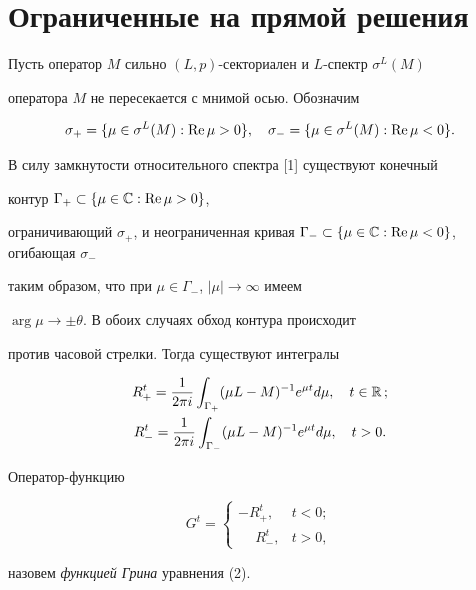 \section{Ограниченные на прямой решения}








Пусть оператор $M$ сильно $(L,p)$-секториален и $L$-спектр $\sigma^L(M)$ 


оператора $M$ не пересекается с мнимой осью. Обозначим


$$


\sigma_+=\{\mu\in\sigma^L(M):


\re\mu>0\},\quad\sigma_-=\{\mu\in\sigma^L(M):\re\mu<0\}.


$$


В силу замкнутости относительного спектра [1] существуют конечный


контур ${\Gamma}_+\subset\{\mu\in{\Bbb C}:\operatorname{Re}\mu>0\}$,


ограничивающий $\sigma_+$, и неограниченная кривая ${\Gamma}_-


\subset\{\mu\in{\Bbb C}:\re\mu<0\}$, огибающая $\sigma_-$


таким образом, что при $\mu\in\Gamma_-$, $|\mu|\to\infty$ имеем


$\arg\mu\to\pm\theta$. В обоих случаях обход контура происходит


против часовой стрелки. Тогда существуют интегралы 


\begin{gather*}


R^t_+=\frac{1}{2\pi i}\int_{\Gamma_+ }(\mu L-M)^{-1}e^{\mu t}d\mu,


\quad t\in\Bbb R\,; \\


%


R^t_-=\frac{1}{2\pi i}\int_{\Gamma_- }(\mu L-M)^{-1}e^{\mu t}d\mu,


\quad t>0.


\end{gather*}








\begin{defn}


Оператор-функцию


$$


G^{t} =\begin{cases}


-R_+^{t}, & t<0; \\


\phantom{-}R_-^{t}, & t>0,


\end{cases}


$$


назовем {\it функцией Грина} уравнения (2).


\end{defn}





